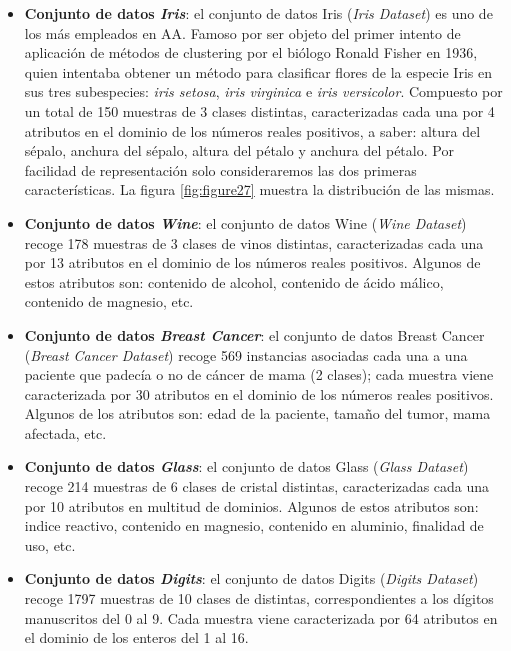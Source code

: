 \begin{itemize}
	
	\item \textbf{Conjunto de datos \textit{Iris}}: el conjunto de datos Iris (\textit{Iris Dataset}) es uno de los más empleados en \acs{AA}. Famoso por ser objeto del primer intento de aplicación de métodos de clustering por el biólogo Ronald Fisher en 1936, quien intentaba obtener un método para clasificar flores de la especie Iris en sus tres subespecies: \textit{iris setosa}, \textit{iris virginica} e \textit{iris versicolor}. Compuesto por un total de 150 muestras de 3 clases distintas, caracterizadas cada una por 4 atributos en el dominio de los números reales positivos, a saber: altura del sépalo, anchura del sépalo, altura del pétalo y anchura del pétalo. Por facilidad de representación solo consideraremos las dos primeras características. La figura \ref{fig:figure27} muestra la distribución de las mismas.
	
	\item \textbf{Conjunto de datos \textit{Wine}}: el conjunto de datos Wine (\textit{Wine Dataset}) recoge 178 muestras de 3 clases de vinos distintas, caracterizadas cada una por 13 atributos en el dominio de los números reales positivos. Algunos de estos atributos son: contenido de alcohol, contenido de ácido málico, contenido de magnesio, etc.
	
	\item \textbf{Conjunto de datos \textit{Breast Cancer}}: el conjunto de datos Breast Cancer (\textit{Breast Cancer Dataset}) recoge 569 instancias asociadas cada una a una paciente que padecía o no de cáncer de mama (2 clases); cada muestra viene caracterizada por 30 atributos en el dominio de los números reales positivos. Algunos de los atributos son: edad de la paciente, tamaño del tumor, mama afectada, etc.
	
	\item \textbf{Conjunto de datos \textit{Glass}}: el conjunto de datos Glass (\textit{Glass Dataset}) recoge 214 muestras de 6 clases de cristal distintas, caracterizadas cada una por 10 atributos en multitud de dominios. Algunos de estos atributos son: indice reactivo, contenido en magnesio, contenido en aluminio, finalidad de uso, etc.
	
	\item \textbf{Conjunto de datos \textit{Digits}}: el conjunto de datos Digits (\textit{Digits Dataset}) recoge 1797 muestras de 10 clases de distintas, correspondientes a los dígitos manuscritos del 0 al 9. Cada muestra viene caracterizada por 64 atributos en el dominio de los enteros del 1 al 16.
	
\end{itemize}

